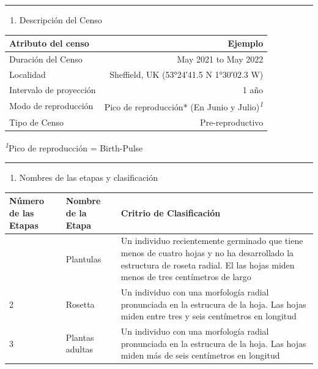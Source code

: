 \documentclass[
]{book}
\providecommand{\tightlist}{%
  \setlength{\itemsep}{0pt}\setlength{\parskip}{0pt}}
\theoremstyle{definition}
\theoremstyle{definition}
\theoremstyle{definition}
\theoremstyle{definition}
\theoremstyle{remark}
\begin{document}
\begin{center}\rule{0.5\linewidth}{0.5pt}\end{center}

\begin{enumerate}
\def\labelenumi{(\alph{enumi})}
\setcounter{enumi}{2}
\tightlist
\item
  Descripción del Censo
\end{enumerate}

\setlength{\LTpost}{0mm}
\begin{longtable}{lr}
\toprule
Atributo del censo & Ejemplo \\ 
\midrule\addlinespace[2.5pt]
Duración del Censo & May 2021 to May 2022 \\ 
Localidad & Sheffield, UK (53°24′41.5 N 1°30′02.3 W) \\ 
Intervalo de proyección & 1 año \\ 
Modo de reproducción & Pico de reproducción* (En Junio y Julio)\textsuperscript{\textit{1}} \\ 
Tipo de Censo & Pre-reproductivo \\ 
\bottomrule
\end{longtable}
\begin{minipage}{\linewidth}
\textsuperscript{\textit{1}}Pico de reproducción = Birth-Pulse\\
\end{minipage}

\begin{center}\rule{0.5\linewidth}{0.5pt}\end{center}

\begin{enumerate}
\def\labelenumi{(\Alph{enumi})}
\setcounter{enumi}{3}
\tightlist
\item
  Nombres de las etapas y clasificación
\end{enumerate}

\begin{longtable}{lll}
\toprule
Número de las Etapas & Nombre de la Etapa & Critrio de Clasificación \\ 
\midrule\addlinespace[2.5pt]
1 & Plantulas & Un individuo recientemente germinado que tiene menos de cuatro hojas y no ha desarrollado la estructura de roseta radial. El las hojas miden menos de tres centímetros de largo \\ 
2 & Rosetta & Un individuo con una morfología radial pronunciada en la estrucura de la hoja. Las hojas miden entre tres y seis centímetros en longitud \\ 
3 & Plantas adultas & Un individuo con una morfología radial pronunciada en la estrucura de la hoja. Las hojas miden más de seis centímetros en longitud \\ 
\bottomrule
\end{longtable}
\end{document}
